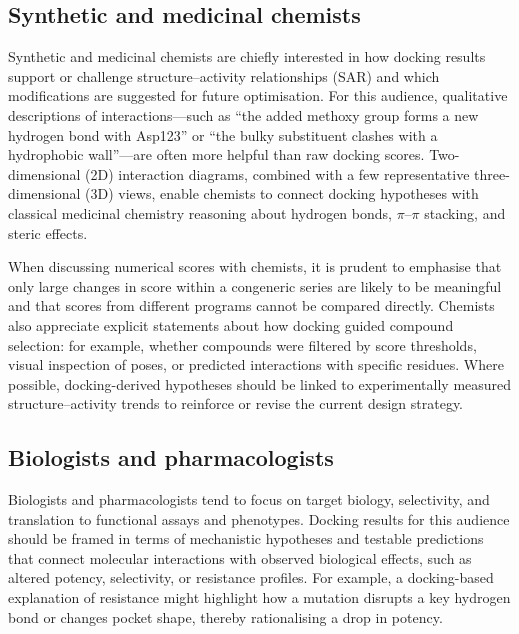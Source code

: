 \documentclass[12pt]{article}
\begin{document}
\subsection{Synthetic and medicinal chemists}

Synthetic and medicinal chemists are chiefly interested in how docking results support or challenge structure--activity relationships (SAR) and which modifications are suggested for future optimisation.\cite{CH11_Kitchen2004,CH11_Forli2015,CH11_cosconati2010} 
For this audience, qualitative descriptions of interactions---such as ``the added methoxy group forms a new hydrogen bond with Asp123'' or ``the bulky substituent clashes with a hydrophobic wall''---are often more helpful than raw docking scores.\cite{CH11_Berry2015,CH11_Glide2004,CH11_Kitchen2004} 
Two-dimensional (2D) interaction diagrams, combined with a few representative three-dimensional (3D) views, enable chemists to connect docking hypotheses with classical medicinal chemistry reasoning about hydrogen bonds, \(\pi\)--\(\pi\) stacking, and steric effects.\cite{CH11_Berry2015,CH11_Forli2015,CH11_zhu2022} 

When discussing numerical scores with chemists, it is prudent to emphasise that only large changes in score within a congeneric series are likely to be meaningful and that scores from different programs cannot be compared directly.\cite{CH11_BindingAffinity2018,CH11_EmpiricalScoring2018,CH11_Warren2006} 
Chemists also appreciate explicit statements about how docking guided compound selection: for example, whether compounds were filtered by score thresholds, visual inspection of poses, or predicted interactions with specific residues.\cite{CH11_Forli2015,CH11_Cheng2012,CH11_zhu2022} 
Where possible, docking-derived hypotheses should be linked to experimentally measured structure--activity trends to reinforce or revise the current design strategy.\cite{CH11_Cheng2012,CH11_cosconati2010,CH11_zhu2022} 

\subsection{Biologists and pharmacologists}

Biologists and pharmacologists tend to focus on target biology, selectivity, and translation to functional assays and phenotypes.\cite{CH11_zhu2022,CH11_Cheng2012,CH11_Forli2015} 
Docking results for this audience should be framed in terms of mechanistic hypotheses and testable predictions that connect molecular interactions with observed biological effects, such as altered potency, selectivity, or resistance profiles.\cite{CH11_Kitchen2004,CH11_zhu2022,CH11_BindingAffinity2018} 
For example, a docking-based explanation of resistance might highlight how a mutation disrupts a key hydrogen bond or changes pocket shape, thereby rationalising a drop in potency.\cite{CH11_Kitchen2004,CH11_Glide2004,CH11_Warren2006} 
\end{document}
